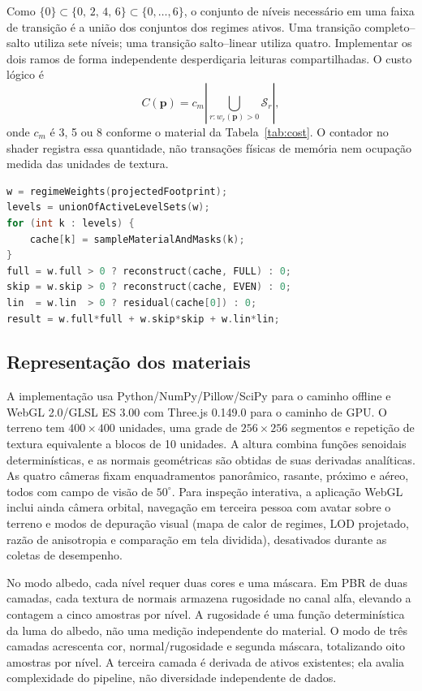 Como $\{0\}\subset\{0,\,2,\,4,\,6\}\subset\{0,\ldots,6\}$, o conjunto de níveis necessário em uma faixa de transição é a união dos conjuntos dos regimes ativos. Uma transição completo--salto utiliza sete níveis; uma transição salto--linear utiliza quatro. Implementar os dois ramos de forma independente desperdiçaria leituras compartilhadas. O custo lógico é
\begin{equation}
C(\mathbf{p})=c_m\left|\bigcup_{r:w_r(\mathbf{p})>0}\mathcal{S}_r\right|,
\label{eq:union}
\end{equation}
onde $c_m$ é 3, 5 ou 8 conforme o material da Tabela~\ref{tab:cost}. O contador no shader registra essa quantidade, não transações físicas de memória nem ocupação medida das unidades de textura.

\begin{lstlisting}[language=C,caption={Pseudocódigo do reuso no caminho adaptativo. Reconstruções compartilham leituras do mesmo nível.},label={lst:reuse}]
w = regimeWeights(projectedFootprint);
levels = unionOfActiveLevelSets(w);
for (int k : levels) {
    cache[k] = sampleMaterialAndMasks(k);
}
full = w.full > 0 ? reconstruct(cache, FULL) : 0;
skip = w.skip > 0 ? reconstruct(cache, EVEN) : 0;
lin  = w.lin  > 0 ? residual(cache[0]) : 0;
result = w.full*full + w.skip*skip + w.lin*lin;
\end{lstlisting}

\subsection{Representação dos materiais}
A implementação usa Python/NumPy/Pillow/SciPy para o caminho offline e WebGL 2.0/GLSL ES 3.00 com Three.js 0.149.0 para o caminho de GPU. O terreno tem $400\times400$ unidades, uma grade de $256\times256$ segmentos e repetição de textura equivalente a blocos de 10 unidades. A altura combina funções senoidais determinísticas, e as normais geométricas são obtidas de suas derivadas analíticas. As quatro câmeras fixam enquadramentos panorâmico, rasante, próximo e aéreo, todos com campo de visão de $50^\circ$. Para inspeção interativa, a aplicação WebGL inclui ainda câmera orbital, navegação em terceira pessoa com avatar sobre o terreno e modos de depuração visual (mapa de calor de regimes, LOD projetado, razão de anisotropia e comparação em tela dividida), desativados durante as coletas de desempenho.

No modo albedo, cada nível requer duas cores e uma máscara. Em PBR de duas camadas, cada textura de normais armazena rugosidade no canal alfa, elevando a contagem a cinco amostras por nível. A rugosidade é uma função determinística da luma do albedo, não uma medição independente do material. O modo de três camadas acrescenta cor, normal/rugosidade e segunda máscara, totalizando oito amostras por nível. A terceira camada é derivada de ativos existentes; ela avalia complexidade do pipeline, não diversidade independente de dados.

